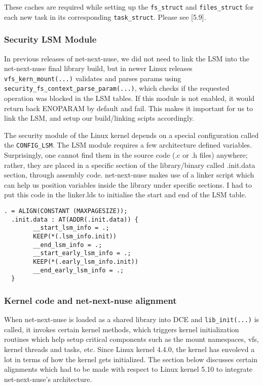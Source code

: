 \documentclass{sig-alternate}
\begin{document}
These caches are required while setting up the \texttt{fs\_struct} and \texttt{files\_struct} for each new task in its corresponding \texttt{task\_struct}. Please see [5.9].


\subsubsection{Security LSM Module}\label{Section_LSM}
In previous releases of net-next-nuse, we did not need to link the LSM into the net-next-nuse final library build, but in newer Linux releases 
\texttt{vfs\_kern\_mount(...)} validates and parses params using \texttt{security\_fs\_context\_parse\_param(...)}, which checks if the requested operation was blocked
in the LSM tables. If this module is not enabled, it would return back ENOPARAM by default and fail. This makes it important for us to link the LSM, and setup our 
build/linking scipts accordingly.

The security module of the Linux kernel depends on a special configuration called the \texttt{CONFIG\_LSM}. The LSM module requires a few architecture
defined variables. Surprisingly, one cannot find them in the source code (.c or .h files) anywhere; rather, they are placed in a specific section
of the library/binary called .init.data section, through assembly code. net-next-nuse makes use of a linker script which can help us position variables inside
the library under specific sections. I had to put this code in the linker.lds to initialise the start and end of the LSM table.
\begin{lstlisting}[style=CStyle]
  . = ALIGN(CONSTANT (MAXPAGESIZE));
  .init.data : AT(ADDR(.init.data)) {    
		__start_lsm_info = .;	
		KEEP(*(.lsm_info.init))
		__end_lsm_info = .;    
		__start_early_lsm_info = .;	
		KEEP(*(.early_lsm_info.init))
		__end_early_lsm_info = .;
  }
\end{lstlisting}

\subsubsection{Kernel code and net-next-nuse alignment}
When net-next-nuse is loaded as a shared library into DCE and \texttt{lib\_init(...)} is called, it invokes certain kernel methods, which triggers 
kernel initialization routines which help setup critical components such as the mount namespaces, vfs, kernel threads and tasks, etc. 
Since Linux kernel 4.4.0, the
kernel has envolevd a lot in terms of how the kernel gets initialized. The section below discusses certain alignments which had to be made with respect to 
Linux kernel 5.10 to integrate net-next-nuse's architecture.
\end{document}
